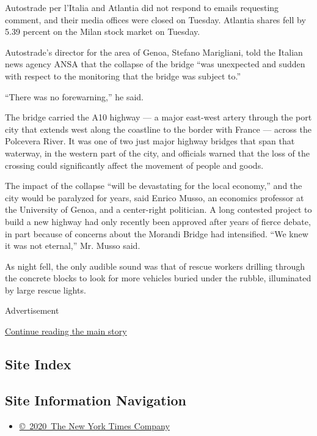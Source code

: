 Autostrade per l'Italia and Atlantia did not respond to emails
requesting comment, and their media offices were closed on Tuesday.
Atlantia shares fell by 5.39 percent on the Milan stock market on
Tuesday.

Autostrade's director for the area of Genoa, Stefano Marigliani, told
the Italian news agency ANSA that the collapse of the bridge ``was
unexpected and sudden with respect to the monitoring that the bridge was
subject to.''

``There was no forewarning,'' he said.

The bridge carried the A10 highway --- a major east-west artery through
the port city that extends west along the coastline to the border with
France --- across the Polcevera River. It was one of two just major
highway bridges that span that waterway, in the western part of the
city, and officials warned that the loss of the crossing could
significantly affect the movement of people and goods.

The impact of the collapse ``will be devastating for the local
economy,'' and the city would be paralyzed for years, said Enrico Musso,
an economics professor at the University of Genoa, and a center-right
politician. A long contested project to build a new highway had only
recently been approved after years of fierce debate, in part because of
concerns about the Morandi Bridge had intensified. ``We knew it was not
eternal,'' Mr. Musso said.

As night fell, the only audible sound was that of rescue workers
drilling through the concrete blocks to look for more vehicles buried
under the rubble, illuminated by large rescue lights.

Advertisement

\protect\hyperlink{after-bottom}{Continue reading the main story}

\hypertarget{site-index}{%
\subsection{Site Index}\label{site-index}}

\hypertarget{site-information-navigation}{%
\subsection{Site Information
Navigation}\label{site-information-navigation}}

\begin{itemize}
\tightlist
\item
  \href{https://help.nytimes.com/hc/en-us/articles/115014792127-Copyright-notice}{©~2020~The
  New York Times Company}
\end{itemize}


